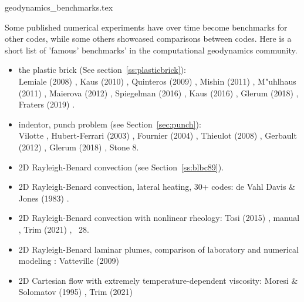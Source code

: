 
\begin{flushright} {\tiny {\color{gray} geodynamics\_benchmarks.tex}} \end{flushright}

Some published numerical experiments have over time become benchmarks for other codes, while some 
others showcased comparisons between codes. Here is a short list of 'famous' benchmarks' in the 
computational geodynamics community.

\begin{itemize}

\item the plastic brick (See section~\ref{ss:plasticbrick}): \\
      Lemiale \etal (2008) \cite{lemm08}, 
      Kaus (2010) \cite{kaus10}, 
      Quinteros \etal (2009) \cite{qurj09}, 
      Mishin (2011) \cite{mishin11}, 
      M{"u}hlhaus \etal (2011) \cite{muso11}, 
      Maierova (2012) \cite{maie12}, 
      Spiegelman \etal (2016) \cite{spmw16}, 
      Kaus \etal (2016) \cite{kapb16}, 
      Glerum \etal (2018) \cite{gltf18}, 
      Fraters \etal (2019) \cite{frbt19}.

\item indentor, punch problem (see Section~\ref{sec:punch}):\\
      Vilotte \etal \cite{vidm82,vidm84,vimd86},
      Hubert-Ferrari \etal (2003) \cite{hukm03}, 
      Fournier \etal (2004) \cite{fojd04}, 
      Thieulot \etal (2008) \cite{thfb08},
      Gerbault (2012) \cite{gerb12}, 
      Glerum \etal (2018) \cite{gltf18},
      Stone 8.

\item 2D Rayleigh-Benard convection (see Section~\ref{ss:blbc89}).


\item 2D Rayleigh-Benard convection, lateral heating, 30+ codes: 
      de Vahl Davis \& Jones (1983) \cite{dejo83}.
\item 2D Rayleigh-Benard convection with nonlinear rheology:  
      Tosi \etal (2015) \cite{tosn15}, \aspect{} manual \cite{aspectmanual}, 
      Trim \etal (2021) \cite{trbs21}, \stone~28.
\item 2D Rayleigh-Benard laminar plumes, comparison of laboratory and numerical modeling : 
      Vatteville \etal (2009) \cite{vavl09}
\item 2D Cartesian flow with extremely temperature-dependent viscosity:
      Moresi \& Solomatov (1995) \cite{moso95}, Trim \etal (2021) \cite{trbs21}


\end{itemize}
